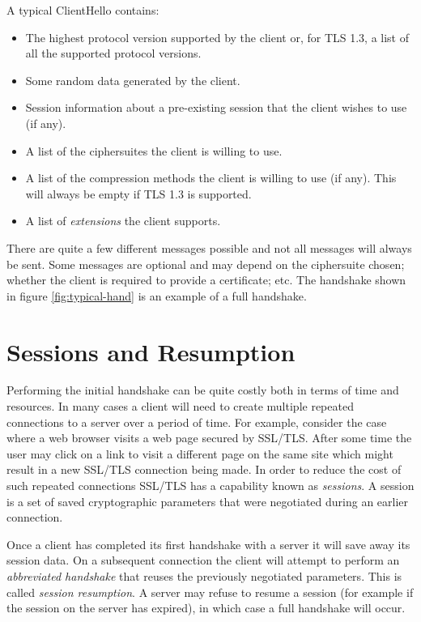 A typical ClientHello contains:
\begin{itemize}
\item The highest protocol version supported by the client or, for TLS 1.3, a
list of all the supported protocol versions.
\item Some random data generated by the client.
\item Session information about a pre-existing session that the client wishes to
use (if any).
\item A list of the ciphersuites the client is willing to use.
\item A list of the compression methods the client is willing to use (if any).
This will always be empty if TLS 1.3 is supported.
\item A list of \emph{extensions} the client supports.
\end{itemize}

There are quite a few different messages possible and not all messages will 
always be sent. Some messages are optional and may depend on the ciphersuite 
chosen; whether the client is required to provide a certificate; etc. The 
handshake shown in figure \ref{fig:typical-hand} is an example of a full 
handshake. 

\section{Sessions and Resumption}

Performing the initial handshake can be quite costly both in terms of time and
resources. In many cases a client will need to create multiple repeated
connections to a server over a period of time. For example, consider the case
where a web browser visits a web page secured by SSL/TLS. After some time the
user may click on a link to visit a different page on the same site which might
result in a new SSL/TLS connection being made. In order to reduce the cost of
such repeated connections SSL/TLS has a capability known as \emph{sessions}. A
session is a set of saved cryptographic parameters that were negotiated during
an earlier connection.

Once a client has completed its first handshake with a server it will save
away its session data. On a subsequent connection the client will attempt to
perform an \emph{abbreviated handshake} that reuses the previously negotiated
parameters.  This is called \emph{session resumption}. A server may refuse to
resume a session (for example if the session on the server has expired), in
which case a full handshake will occur.


